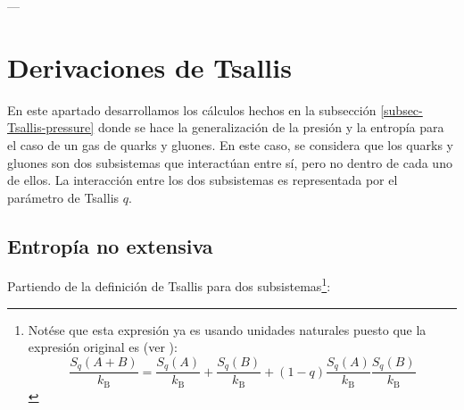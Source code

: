 




---

\section{Derivaciones de Tsallis}\label{app:Tsallis}

En este apartado desarrollamos los cálculos hechos en la subsección \ref{subsec-Tsallis-pressure} donde se hace la generalización de la presión y la entropía para el caso de un gas de quarks y gluones. En este caso, se considera que los quarks y gluones son dos subsistemas que interactúan entre sí, pero no dentro de cada uno de ellos. La interacción entre los dos subsistemas es representada por el parámetro de Tsallis $q$.

\subsection{Entropía no extensiva}\label{app:Tsallis-entropy}
Partiendo de la definición de Tsallis para dos subsistemas\footnote{Notése que esta expresión ya es usando unidades naturales puesto que la expresión original es (ver \cite{Tsallis1988}):
\[
\frac{{S}_{q}(A+B)}{{k}_{\mathrm{B}}} = \frac{{S}_{q}(A)}{{k}_{\mathrm{B}}} + \frac{{S}_{q}(B)}{{k}_{\mathrm{B}}} + (1-q)\frac{{S}_{q}(A)}{{k}_{\mathrm{B}}}\frac{{S}_{q}(B)}{{k}_{\mathrm{B}}}
\]}:

